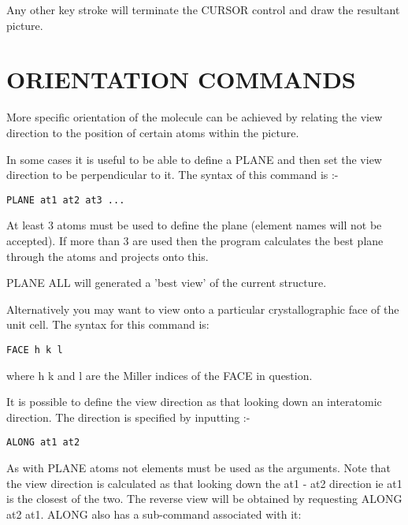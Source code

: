 \documentclass[10pt,a4paper]{report}
\begin{document}
Any other key stroke will terminate the CURSOR control and draw
the
resultant picture.
\section{ORIENTATION COMMANDS}


More specific orientation of the molecule can be achieved by
relating
the view direction to the position of certain atoms within the
picture.


\bigskip{}




In some cases it is useful to be able to define a PLANE and
then set
the view direction to be perpendicular to it. The syntax of this
command is :-
\small\begin{verbatim}
PLANE at1 at2 at3 ...
\end{verbatim}\normalsize


At least 3 atoms must be used to define the plane (element names
will
not be accepted). If more than 3 are used then the program
calculates
the best plane through the atoms and projects onto this.


\bigskip{}
PLANE ALL will generated a 'best view' of the current structure.


\bigskip{}




Alternatively you may want to view onto a particular
crystallographic
face of the unit cell. The syntax for this command is:
\small\begin{verbatim}
FACE h k l
\end{verbatim}\normalsize


where h k and l are the Miller indices of the FACE in question.


\bigskip{}




It is possible to define the view direction as that looking
down an
interatomic direction. The direction is specified by inputting
:-
\small\begin{verbatim}
ALONG at1 at2
\end{verbatim}\normalsize


As with PLANE atoms not elements must be used as the arguments.
Note
that the view direction is calculated as that looking down the
at1 - at2
direction ie at1 is the closest of the two. The reverse view will
be
obtained by requesting ALONG at2 at1. ALONG also has a
sub-command
associated with it:
\end{document}
